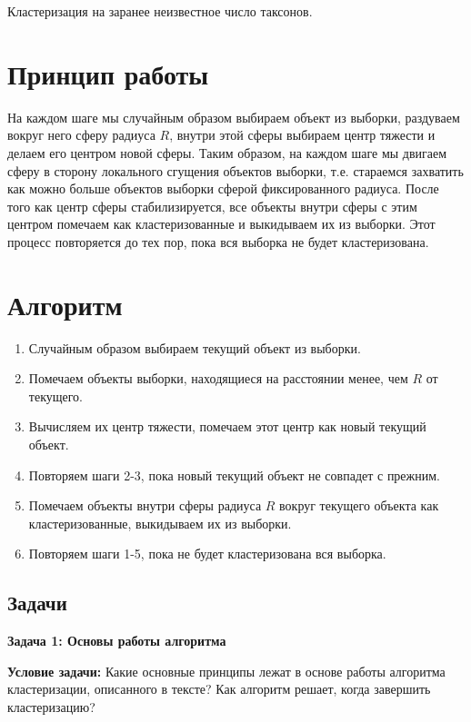 Кластеризация на заранее неизвестное число таксонов.

\section*{Принцип работы}

На каждом шаге мы случайным образом выбираем объект из выборки, раздуваем вокруг него сферу радиуса \( R \), внутри этой сферы выбираем центр тяжести и делаем его центром новой сферы. Таким образом, на каждом шаге мы двигаем сферу в сторону локального сгущения объектов выборки, т.е. стараемся захватить как можно больше объектов выборки сферой фиксированного радиуса. После того как центр сферы стабилизируется, все объекты внутри сферы с этим центром помечаем как кластеризованные и выкидываем их из выборки. Этот процесс повторяется до тех пор, пока вся выборка не будет кластеризована.

\section*{Алгоритм}

\begin{enumerate}
    \item Случайным образом выбираем текущий объект из выборки.
    \item Помечаем объекты выборки, находящиеся на расстоянии менее, чем \( R \) от текущего.
    \item Вычисляем их центр тяжести, помечаем этот центр как новый текущий объект.
    \item Повторяем шаги 2-3, пока новый текущий объект не совпадет с прежним.
    \item Помечаем объекты внутри сферы радиуса \( R \) вокруг текущего объекта как кластеризованные, выкидываем их из выборки.
    \item Повторяем шаги 1-5, пока не будет кластеризована вся выборка.
\end{enumerate}

\subsection{Задачи}

\textbf{Задача 1: Основы работы алгоритма}

\textbf{Условие задачи:}
Какие основные принципы лежат в основе работы алгоритма кластеризации, описанного в тексте? Как алгоритм решает, когда завершить кластеризацию?

